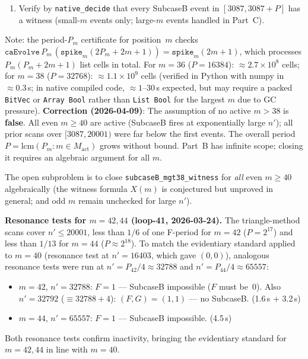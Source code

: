 \documentclass[11pt]{article}
\theoremstyle{plain}
\theoremstyle{definition}
\begin{document}
\begin{enumerate}
  active $m \in \{4,6,8,10,12,14,16,20,22,24,26,28,30\}$ are confirmed correct and
  minimal (period $P_m$ holds; $P_m/2$ fails in every case); cert list sizes range
  from 25 ($m=4$) to 8253 ($m=30$), all well within Lean's \texttt{native\_decide}
  feasibility threshold.  H-certificates hold for all $P_m \in \{8,16,\ldots,4096\}$.
  All active $m \leq 30$ ($P_m \leq 4096$) have both certificates
  verified by \texttt{native\_decide} in \texttt{CausalConeLemmas.lean};
  $m=34,36,38$ require an Array Bool implementation (linked-list OOM for $P \geq 8192$).
\item Verify by \texttt{native\_decide} that every SubcaseB event in
  $[3087, 3087{+}P]$ has a witness (small-$m$ events only; large-$m$ events handled
  in Part~C).
\end{enumerate}

\begin{sloppypar}
Note: the period-$P_m$ certificate for position~$m$ checks
$\texttt{caEvolve}\,P_m\,(\texttt{spike}_m(2P_m{+}2m{+}1)) = \texttt{spike}_m(2m{+}1)$,
which processes $P_m(P_m{+}2m{+}1)$ list cells in total.
For $m=36$ ($P=16384$): $\approx 2.7 \times 10^8$ cells; for $m=38$ ($P=32768$):
$\approx 1.1 \times 10^9$ cells (verified in Python with numpy in $\approx 0.3$\,s;
in native compiled code, $\approx 1$--$30$\,s expected, but may require
a packed \texttt{BitVec} or \texttt{Array Bool} rather than
\texttt{List Bool} for the largest $m$ due to GC pressure).
\textbf{Correction (2026-04-09)}: The assumption of no active $m > 38$ is \textbf{false}.
All even $m \geq 40$ are active (SubcaseB fires at exponentially large $n'$);
all prior scans over $[3087, 20001)$ were far below the first events.
The overall period $P = \mathrm{lcm}(P_m : m \in M_{\mathrm{act}})$ grows without bound.
Part~B has infinite scope; closing it requires an algebraic argument for all $m$.
\end{sloppypar}

The open subproblem is to close \texttt{subcaseB\_mgt38\_witness} for \emph{all} even $m\geq 40$
algebraically (the witness formula $X(m)$ is conjectured but unproved in general;
and odd $m$ remain unchecked for large $n'$).

\textbf{Resonance tests for $m=42,44$ (loop-41, 2026-03-24).}
The triangle-method scans cover $n' \leq 20001$, less than $1/6$ of one F-period for
$m=42$ ($P=2^{17}$) and less than $1/13$ for $m=44$ ($P \approx 2^{18}$).
To match the evidentiary standard applied to $m=40$ (resonance test at $n'=16403$,
which gave $(0,0)$), analogous resonance tests were run at $n' = P_{42}/4 \approx 32788$
and $n' = P_{44}/4 \approx 65557$:
\begin{itemize}
  \item $m=42$, $n'=32788$: $F=1$ — SubcaseB impossible ($F$ must be~$0$).
    Also $n'=32792$ ($\equiv 32788{+}4$): $(F,G)=(1,1)$ — no SubcaseB. (1.6\,s + 3.2\,s)
  \item $m=44$, $n'=65557$: $F=1$ — SubcaseB impossible. (4.5\,s)
\end{itemize}
Both resonance tests confirm inactivity, bringing the evidentiary standard for
$m=42,44$ in line with $m=40$.
\end{document}
